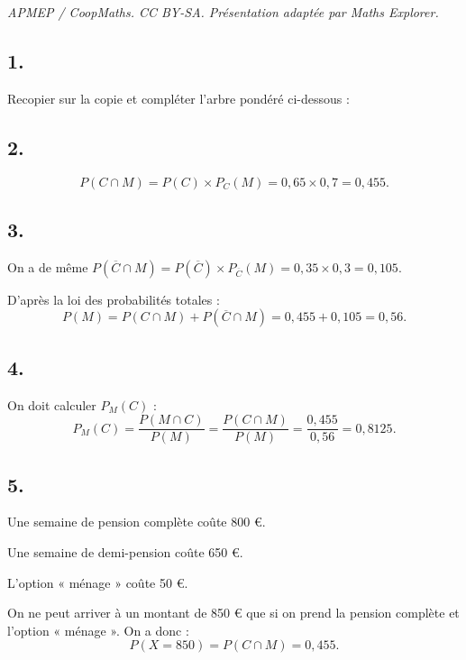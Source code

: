 \documentclass[10pt]{article}
\begin{document}
\noindent\textit{APMEP / CoopMaths. CC BY-SA. Présentation adaptée par Maths Explorer.}\par\medskip
\subsection*{1.}
	
	Recopier sur la copie et compléter l’arbre pondéré ci-dessous :
	
\begin{center}
\end{center}
	
	\subsection*{2.}
	
	\[
	P(C \cap M) = P(C) \times P_C(M) = 0,65 \times 0,7 = 0,455.
	\]
	
	\subsection*{3.}
	
	On a de même \(P(\overline{C} \cap M) = P(\overline{C}) \times P_{\overline{C}}(M) = 0,35 \times 0,3 = 0,105\).
	
	D’après la loi des probabilités totales :
	\[
	P(M) = P(C \cap M) + P(\overline{C} \cap M) = 0,455 + 0,105 = 0,56.
	\]
	
	\subsection*{4.}
	
	On doit calculer \(P_M(C)\) :
	\[
	P_M(C) = \dfrac{P(M \cap C)}{P(M)} = \dfrac{P(C \cap M)}{P(M)} = \dfrac{0,455}{0,56} = 0,8125.
	\]
	
	\subsection*{5.}
	
	Une semaine de pension complète coûte 800 €.
	
	Une semaine de demi-pension coûte 650 €.
	
	L’option « ménage » coûte 50 €.
	
	On ne peut arriver à un montant de 850 € que si on prend la pension complète et l’option « ménage ». On a donc :
	\[
	P(X = 850) = P(C \cap M) = 0,455.
	\]
\end{document}
